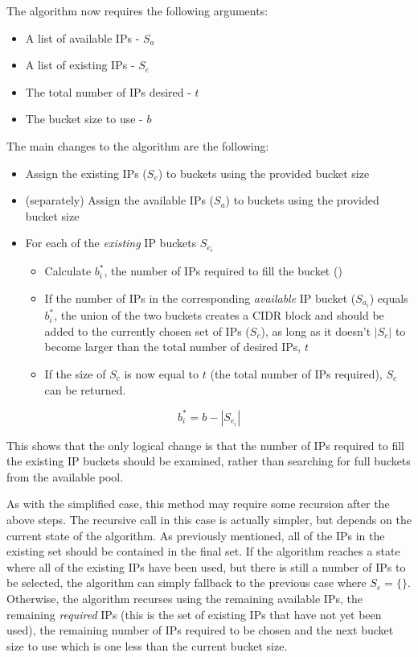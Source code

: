 The algorithm now requires the following arguments:

\begin{itemize}
\item{A list of available IPs - $S_a$}
\item{A list of existing IPs - $S_e$}
\item{The total number of IPs desired - $t$}
\item{The bucket size to use - $b$}
\end{itemize}

The main changes to the algorithm are the following:

\begin{itemize}
  \item{Assign the existing IPs ($S_e$) to buckets using the provided bucket size}
  \item{(separately) Assign the available IPs ($S_a$) to buckets using the provided bucket size}
  \item{For each of the \textit{existing} IP buckets $S_{e_i}$}
      \begin{itemize}
      \item{Calculate $b^*_i$, the number of IPs required to fill the bucket ()}
      \item{If the number of IPs in the corresponding \textit{available} IP bucket ($S_{a_i}$) equals $b^*_i$, the union of the two buckets creates a CIDR block and should be added to the currently chosen set of IPs ($S_c$), as long as it doesn't $|S_c|$ to become larger than the total number of desired IPs, $t$}
      \item{If the size of $S_c$ is now equal to $t$ (the total number of IPs required), $S_c$ can be returned.}
      \end{itemize}
\end{itemize}


\begin{equation}\label{eq:ipsToFillBucket}
b^*_i= b-|S_{e_i}|
\end{equation}


This shows that the only logical change is that the number of IPs required to fill the existing IP buckets should be examined, rather than searching for full buckets from the available pool. 

As with the simplified case, this method may require some recursion after the above steps. The recursive call in this case is actually simpler, but depends on the current state of the algorithm. As previously mentioned, all of the IPs in the existing set should be contained in the final set. If the algorithm reaches a state where all of the existing IPs have been used, but there is still a number of IPs to be selected, the algorithm can simply fallback to the previous case where $S_e = \{\}$. Otherwise, the algorithm recurses using the remaining available IPs, the remaining \textit{required} IPs (this is the set of existing IPs that have not yet been used), the remaining number of IPs required to be chosen and the next bucket size to use which is one less than the current bucket size.

